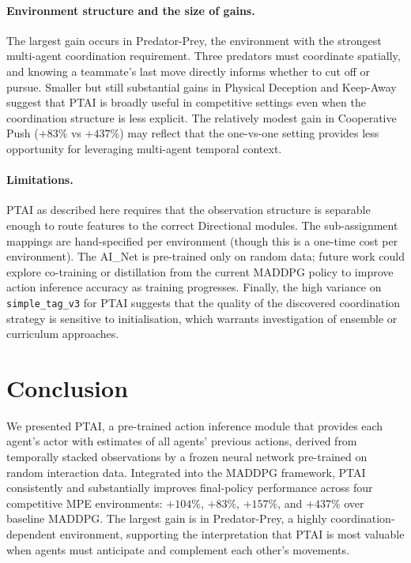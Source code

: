 \documentclass[12pt]{article}
\begin{document}
\paragraph{Environment structure and the size of gains.}
The largest gain occurs in Predator-Prey, the environment with the strongest multi-agent
coordination requirement. Three predators must coordinate spatially, and knowing a
teammate's last move directly informs whether to cut off or pursue. Smaller but still
substantial gains in Physical Deception and Keep-Away suggest that PTAI is broadly useful
in competitive settings even when the coordination structure is less explicit. The
relatively modest gain in Cooperative Push ($+83\%$ vs $+437\%$) may reflect that the
one-vs-one setting provides less opportunity for leveraging multi-agent temporal context.

\paragraph{Limitations.}
PTAI as described here requires that the observation structure is separable enough to
route features to the correct Directional modules. The sub-assignment mappings are
hand-specified per environment (though this is a one-time cost per environment). The
AI\_Net is pre-trained only on random data; future work could explore co-training or
distillation from the current MADDPG policy to improve action inference accuracy as
training progresses. Finally, the high variance on \texttt{simple\_tag\_v3} for PTAI
suggests that the quality of the discovered coordination strategy is sensitive to
initialisation, which warrants investigation of ensemble or curriculum approaches.

\section{Conclusion}

We presented PTAI, a pre-trained action inference module that provides each agent's actor
with estimates of all agents' previous actions, derived from temporally stacked
observations by a frozen neural network pre-trained on random interaction data. Integrated
into the MADDPG framework, PTAI consistently and substantially improves final-policy
performance across four competitive MPE environments: $+104\%$, $+83\%$, $+157\%$, and
$+437\%$ over baseline MADDPG. The largest gain is in Predator-Prey, a highly
coordination-dependent environment, supporting the interpretation that PTAI is most
valuable when agents must anticipate and complement each other's movements.
\end{document}
